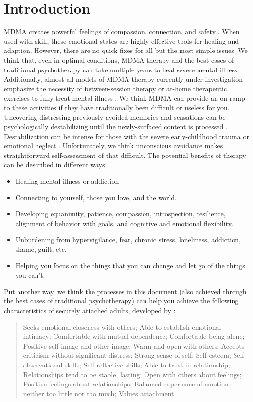 \documentclass[12pt,letterpaper]{book}
\begin{document}
\section{Introduction}
MDMA creates powerful feelings of compassion, connection, and safety \cite{fedduciaMDMAMemoryReconsolidation}. When used with skill, these emotional states are highly effective tools for healing and adaption. However, there are no quick fixes for all but the most simple issues. We think that, even in optimal conditions, MDMA therapy and the best cases of traditional psychotherapy can take multiple years to heal severe mental illness. Additionally, almost all models of MDMA therapy currently under investigation emphasize the necessity of between-session therapy or at-home therapeutic exercises to fully treat mental illness \cite{bathje2022Integration}. We think MDMA can provide an on-ramp to these activities if they have traditionally been difficult or useless for you. Uncovering distressing previously-avoided memories and sensations can be psychologically destabilizing until the newly-surfaced content is processed \cite{olthofDestabilization}. Destabilization can be intense for those with the severe early-childhood trauma or emotional neglect \cite{studyingHarms}. Unfortunately, we think unconscious avoidance makes straightforward self-assessment of that difficult. The potential benefits of therapy can be described in different ways:
\begin{itemize}
    \item Healing mental illness or addiction
    \item Connecting to yourself, those you love, and the world.
    \item Developing equanimity, patience, compassion, introspection, resilience, alignment of behavior with goals, and cognitive and emotional flexibility.
    \item Unburdening from hypervigilance, fear, chronic stress, loneliness, addiction, shame, guilt, etc.
    \item Helping you focus on the things that you can change and let go of the things you can't.
\end{itemize}

Put another way, we think the processes in this document (also achieved through the best cases of traditional psychotherapy) can help you achieve the following characteristics of securely attached adults, developed by \textcite{brownAttachmentDisturbances}:
\begin{quotation}
Seeks emotional closeness with others; Able to establish emotional intimacy; Comfortable with mutual dependence; Comfortable being alone; Positive self-image and other image; Warm and open with others; Accepts criticism without significant distress; Strong sense of self; Self-esteem; Self-observational skills; Self-reflective skills; Able to trust in relationship; Relationships tend to be stable, lasting; Open with others about feelings; Positive feelings about relationships; Balanced experience of emotions-neither too little nor too much; Values attachment
\end{quotation}
\end{document}
